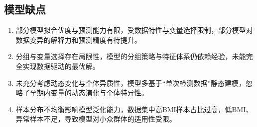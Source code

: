 \documentclass[withoutpreface,bwprint]{cumcmthesis} %
\begin{document}
\subsection{模型缺点}
\begin{enumerate}
    \item 部分模型拟合优度与预测能力有限，受数据特性与变量选择限制，部分模型对数据变异的解释力和预测精度有待提升。
    \item 分组与变量选择存在局限性，模型的分组策略与特征体系仍依赖经验，未能完全实现数据驱动的最优解。
    \item 未充分考虑动态变化与个体异质性，模型多基于“单次检测数据”静态建模，忽略了孕期内变量的动态演化与个体特异性。
    \item 样本分布不均衡影响模型泛化能力，数据集中高BMI样本占比过高，低BMI、异常样本不足，导致模型对小众群体的适用性受限。
\end{enumerate}





\begin{appendices}
\end{appendices}
\end{document}

